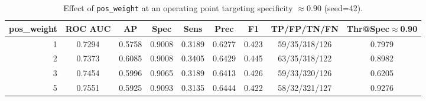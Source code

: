 \begin{table}[ht]
\centering
\caption{Effect of \texttt{pos\_weight} at an operating point targeting specificity $\approx 0.90$ (seed=42).}
\label{tab:pos_weight_sweep}
\begin{tabular}{rcccccccc}
\hline
pos\_weight & ROC AUC & AP & Spec & Sens & Prec & F1 & TP/FP/TN/FN & Thr@Spec$\approx$0.90 \\
\hline
1 & 0.7294 & 0.5758 & 0.9008 & 0.3189 & 0.6277 & 0.423 & 59/35/318/126 & 0.7979 \\
2 & 0.7373 & 0.6085 & 0.9008 & 0.3405 & 0.6429 & 0.445 & 63/35/318/122 & 0.8982 \\
3 & 0.7454 & 0.5996 & 0.9065 & 0.3189 & 0.6413 & 0.426 & 59/33/320/126 & 0.6205 \\
5 & 0.7551 & 0.5925 & 0.9093 & 0.3135 & 0.6444 & 0.422 & 58/32/321/127 & 0.9276 \\
\hline
\end{tabular}
\end{table}
